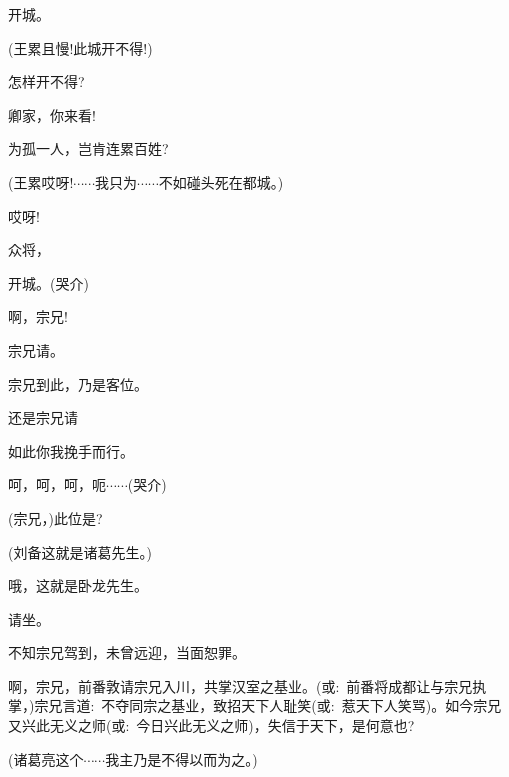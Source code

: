 {开城。

(王累\hspace{30pt}且慢!此城开不得!)

怎样开不得?

卿家，你来看!

为孤一人，岂肯连累百姓?


(王累\hspace{30pt}哎呀!$\cdots{}\cdots{}$我只为$\cdots{}\cdots{}$不如碰头死在都城。)

哎呀!




众将，

开城。({\hwfs 哭介})

\vspace{5pt}

啊，宗兄!

宗兄请。

宗兄到此，乃是客位。

还是宗兄请

如此你我挽手而行。

呵，呵，呵，呃$\cdots{}\cdots{}$({\hwfs 哭}{\hwfs 介})

\vspace{5pt}

(宗兄，)此位是?

(刘备\hspace{30pt}这就是诸葛先生。)

哦，这就是卧龙先生。

请坐。

不知宗兄驾到，未曾远迎，当面恕罪。

啊，宗兄，前番敦请宗兄入川，共掌汉室之基业。({\akai 或}:~前番将成都让与宗兄执掌，)宗兄言道:~不夺同宗之基业，致招天下人耻笑({\akai 或}:~惹天下人笑骂)。如今宗兄又兴此无义之师({\akai 或}:~今日兴此无义之师)，失信于天下，是何意也?

(诸葛亮\hspace{20pt}这个$\cdots{}\cdots{}$我主乃是不得以而为之。)

}
